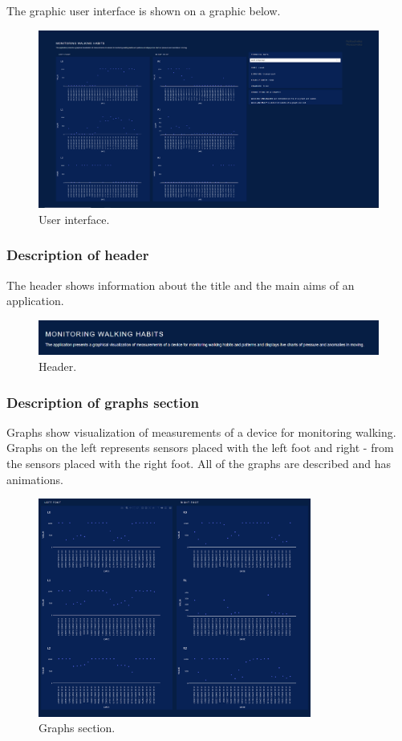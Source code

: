 \documentclass[a4paper,12pt,oneside]{article}
\begin{document}
The graphic user interface is shown on a graphic below.

\begin{figure}[ht]
\centering
\includegraphics[width=1\textwidth]{cale.PNG}
\caption{User interface.}
\label{fig:k1}
\end{figure}

\subsubsection{Description of header}
The header shows information about the title and the main aims of an application.

\begin{figure}[ht]
\centering
\includegraphics[width=1\textwidth]{heager.PNG}
\caption{Header.}
\label{fig:k1}
\end{figure}


\subsubsection{Description of graphs section}
Graphs show visualization of measurements of a device for monitoring walking. Graphs on the left represents sensors placed with the left foot and right - from the sensors placed with the right foot. All of the graphs are described and has animations.

\begin{figure}[ht]
\centering
\includegraphics[width=0.8\textwidth]{wykresy.PNG}
\caption{Graphs section.}
\label{fig:k1}
\end{figure}
\end{document}
